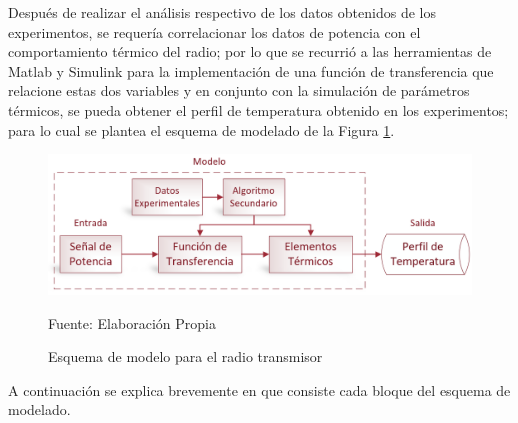 Después de realizar el análisis respectivo de los datos obtenidos de los experimentos, se requería correlacionar los datos de potencia con el comportamiento térmico del radio; por lo que se recurrió a las herramientas de Matlab y Simulink para la implementación de una función de transferencia que relacione estas dos variables y en conjunto con la simulación de parámetros térmicos, se pueda obtener el perfil de temperatura obtenido en los experimentos; para lo cual se plantea el esquema de modelado de la Figura \ref{esquema_modelo_radio}. 

\begin{figure}[H]
\centering
\includegraphics[scale=0.52]{Figuras/esquema_modelo_radio.png}
\caption{Esquema de modelo para el radio transmisor}
Fuente: Elaboración Propia
\label{esquema_modelo_radio}
\end{figure}

 A continuación se explica brevemente en que consiste cada bloque del esquema de modelado.
 
